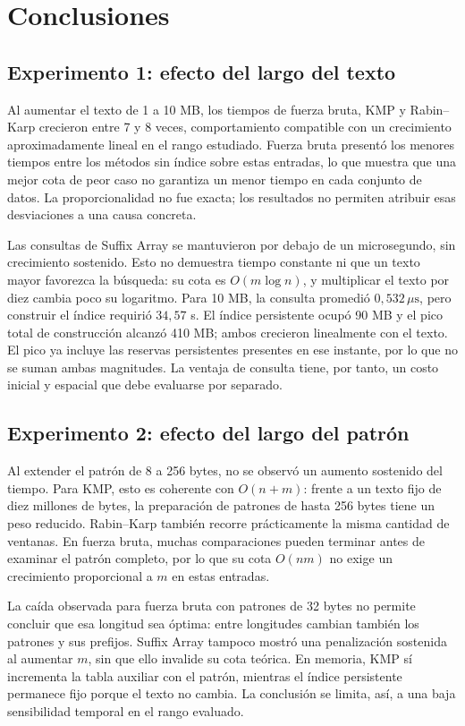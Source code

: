 \section{Conclusiones}

\subsection{Experimento 1: efecto del largo del texto}

Al aumentar el texto de 1 a 10 MB, los tiempos de fuerza bruta, KMP y
Rabin--Karp crecieron entre 7 y 8 veces, comportamiento compatible con un
crecimiento aproximadamente lineal en el rango estudiado. Fuerza bruta
presentó los menores tiempos entre los métodos sin índice sobre estas
entradas, lo que muestra que una mejor cota de peor caso no garantiza un
menor tiempo en cada conjunto de datos. La proporcionalidad no fue exacta;
los resultados no permiten atribuir esas desviaciones a una causa concreta.

Las consultas de Suffix Array se mantuvieron por debajo de un microsegundo,
sin crecimiento sostenido. Esto no demuestra tiempo constante ni que un
texto mayor favorezca la búsqueda: su cota es \(O(m\log n)\), y multiplicar
el texto por diez cambia poco su logaritmo. Para 10 MB, la consulta promedió
\(0{,}532\,\mu\mathrm{s}\), pero construir el índice requirió \(34{,}57\) s.
El índice persistente ocupó 90 MB y el pico total de construcción alcanzó
410 MB; ambos crecieron linealmente con el texto. El pico ya incluye las
reservas persistentes presentes en ese instante, por lo que no se suman
ambas magnitudes. La ventaja de consulta tiene, por tanto, un costo inicial
y espacial que debe evaluarse por separado.

\subsection{Experimento 2: efecto del largo del patrón}

Al extender el patrón de 8 a 256 bytes, no se observó un aumento sostenido
del tiempo. Para KMP, esto es coherente con \(O(n+m)\): frente a un texto
fijo de diez millones de bytes, la preparación de patrones de hasta
256 bytes tiene un peso reducido. Rabin--Karp también recorre prácticamente
la misma cantidad de ventanas. En fuerza bruta, muchas comparaciones pueden
terminar antes de examinar el patrón completo, por lo que su cota
\(O(nm)\) no exige un crecimiento proporcional a \(m\) en estas entradas.

La caída observada para fuerza bruta con patrones de 32 bytes no permite
concluir que esa longitud sea óptima: entre longitudes cambian también los
patrones y sus prefijos. Suffix Array tampoco mostró una penalización
sostenida al aumentar \(m\), sin que ello invalide su cota teórica. En
memoria, KMP sí incrementa la tabla auxiliar con el patrón, mientras el
índice persistente permanece fijo porque el texto no cambia. La conclusión
se limita, así, a una baja sensibilidad temporal en el rango evaluado.

